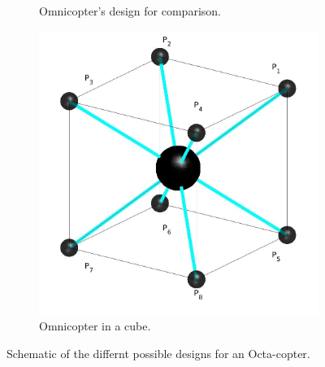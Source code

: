 \begin{figure}[!h]
{\begin{subfigure}[b]{0.6\textwidth}
    \caption{Omnicopter's design for comparison.} \label{fig:Octacopter_resultb}
  \end{subfigure}
  \hspace*{\fill} %
  \begin{subfigure}[b]{0.5\textwidth}
    \includegraphics[width=\linewidth]{images/Octa_cube.jpg}
    \caption{Omnicopter in a cube.} \label{fig:Octacopter_resultc}
  \end{subfigure}}
  \caption{Schematic of the differnt possible designs for an Octa-copter.}
  \label{fig:Octacopter_result}
\end{figure}

